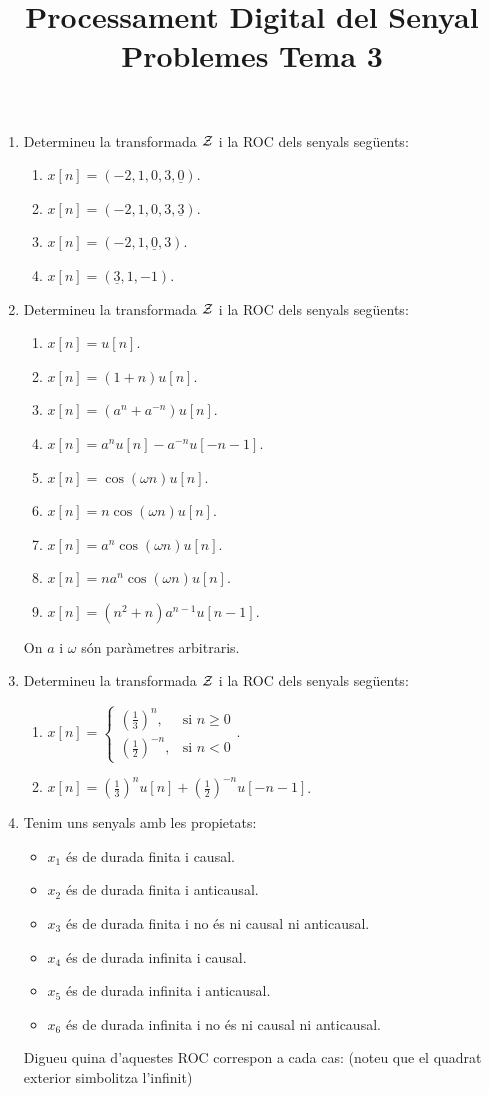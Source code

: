 \documentclass[a4paper,12pt]{article}
\title{Processament Digital del Senyal \\ Problemes Tema 3}
\date{}
\newcommand\cZ{{\cal Z}}
\begin{document}
\maketitle{}

\begin{enumerate}
\item Determineu la transformada $\cZ$ i la ROC dels senyals següents:
  \begin{enumerate}
  \item $x[n]=(-2,1,0,3,\underline{0})$.
  \item $x[n]=(-2,1,0,3,\underline{3})$.
  \item $x[n]=(-2,1,\underline0,3)$.
  \item $x[n]=(\underline{3},1,-1)$.
  \end{enumerate}
\item Determineu la transformada $\cZ$ i la ROC dels senyals següents:
  \begin{enumerate}
  \item $x[n]=u[n]$.
  \item $x[n]=(1+n)u[n]$.
  \item $x[n]=(a^n+a^{-n})u[n]$.
  \item $x[n]=a^nu[n]-a^{-n}u[-n-1]$.
  \item $x[n]=\cos(\omega n) u[n]$.
  \item $x[n]=n\cos(\omega n) u[n]$.
  \item $x[n]=a^n\cos(\omega n)u[n]$.
  \item $x[n]=na^n\cos(\omega n)u[n]$.
  \item $x[n]=(n^2+n)a^{n-1}u[n-1]$.
  \end{enumerate}
  On $a$ i $\omega$ són paràmetres arbitraris.
\item Determineu la transformada $\cZ$ i la ROC dels senyals següents:
  \begin{enumerate}
  \item $x[n]=\begin{cases}
      \left(\frac13\right)^n, & \text{si $n\ge 0$} \\
      \left(\frac12\right)^{-n}, & \text{si $n<0$}
    \end{cases} $.
  \item $x[n]=\left(\frac13\right)^nu[n]+\left(\frac12\right)^{-n}u[-n-1]$.
  \end{enumerate}
\item Tenim uns senyals amb les propietats:
  \begin{itemize}
  \item $x_1$ és de durada finita i causal.
  \item $x_2$ és de durada finita i anticausal.
  \item $x_3$ és de durada finita i no és ni causal ni anticausal.
  \item $x_4$ és de durada infinita i causal.
  \item $x_5$ és de durada infinita i anticausal.
  \item $x_6$ és de durada infinita i no és ni causal ni anticausal.
  \end{itemize}
  Digueu quina d'aquestes ROC correspon a cada cas: (noteu que el
  quadrat exterior simbolitza l'infinit)


\end{enumerate}
\end{document}
